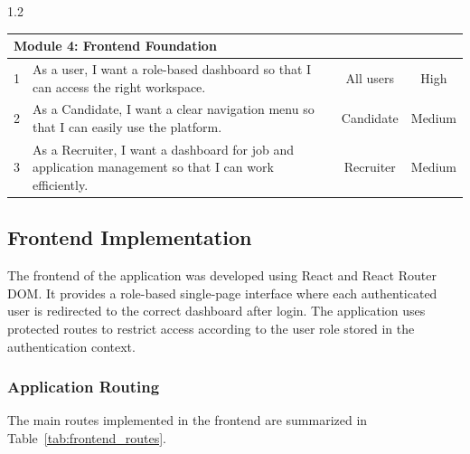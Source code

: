 \begin{spacing}{1.2}
\begin{center}
\begin{tabularx}{\textwidth}{|l|X|c|c|}
\multicolumn{4}{|l|}{\cellcolor{gray!10}\textbf{Module 4: Frontend Foundation}} \\ \hline
1 & As a user, I want a role-based dashboard so that I can access the right workspace. & All users & High \\ \hline
2 & As a Candidate, I want a clear navigation menu so that I can easily use the platform. & Candidate & Medium \\ \hline
3 & As a Recruiter, I want a dashboard for job and application management so that I can work efficiently. & Recruiter & Medium \\ \hline

\end{tabularx}
\end{center}
\end{spacing}

\subsection{Frontend Implementation}

The frontend of the application was developed using React and React Router DOM. It provides a role-based single-page interface where each authenticated user is redirected to the correct dashboard after login. The application uses protected routes to restrict access according to the user role stored in the authentication context.

\subsubsection{Application Routing}

The main routes implemented in the frontend are summarized in Table~\ref{tab:frontend_routes}.


